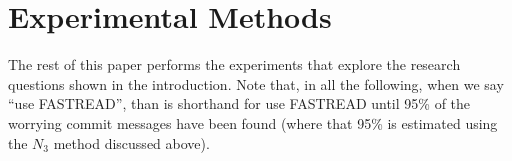 \documentclass[10pt,journal,compsoc]{IEEEtran}
\begin{document}






\section{Experimental Methods}

The rest of this paper performs the experiments
that explore the research questions shown in the introduction.
Note that, in all the following, when we say ``use FASTREAD'', than is shorthand for use FASTREAD until
95\% of the worrying commit messages have been found (where that 95\% is estimated using the $N_3$ method discussed above).
\end{document}
